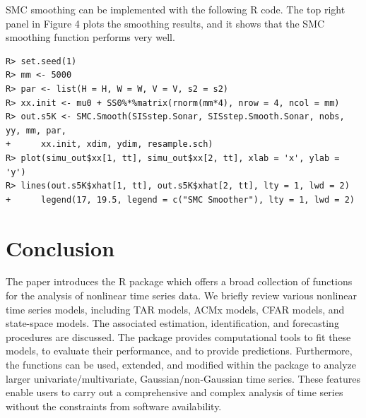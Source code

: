 SMC smoothing can be implemented with the following R code. The top right panel in Figure 4 plots the smoothing results, and it shows that the SMC smoothing function performs very well.
\begin{verbatim}
R> set.seed(1)
R> mm <- 5000
R> par <- list(H = H, W = W, V = V, s2 = s2)
R> xx.init <- mu0 + SS0%*%matrix(rnorm(mm*4), nrow = 4, ncol = mm)
R> out.s5K <- SMC.Smooth(SISstep.Sonar, SISstep.Smooth.Sonar, nobs, yy, mm, par,
+      xx.init, xdim, ydim, resample.sch)
R> plot(simu_out$xx[1, tt], simu_out$xx[2, tt], xlab = 'x', ylab = 'y')
R> lines(out.s5K$xhat[1, tt], out.s5K$xhat[2, tt], lty = 1, lwd = 2)
+      legend(17, 19.5, legend = c("SMC Smoother"), lty = 1, lwd = 2)
\end{verbatim}


\section{Conclusion}
The paper introduces the {R} package  which offers a broad collection of functions for the analysis of nonlinear time series data. We briefly review various nonlinear time series models, including TAR models, ACMx models, CFAR models, and state-space models. The associated estimation, identification, and forecasting procedures are discussed. The  package provides computational tools to fit these models, to evaluate their performance, and to provide predictions. Furthermore, the functions can be used, extended, and modified within the package to analyze larger univariate/multivariate, Gaussian/non-Gaussian time series. These features enable users to carry out a comprehensive and complex analysis of time series without the constraints from software availability.









\address{Xialu Liu\\
  Department of Management Information Systems\\
  San Diego State University\\
  5500 Campanile Drive, San Diego, CA 92182\\
  USA\\
  }

\address{Rong Chen\\
  Department of Statistics\\
  Rutgers University\\
  57 US Highway 1, New Brunswick, NJ 08901\\
  USA\\
  }

